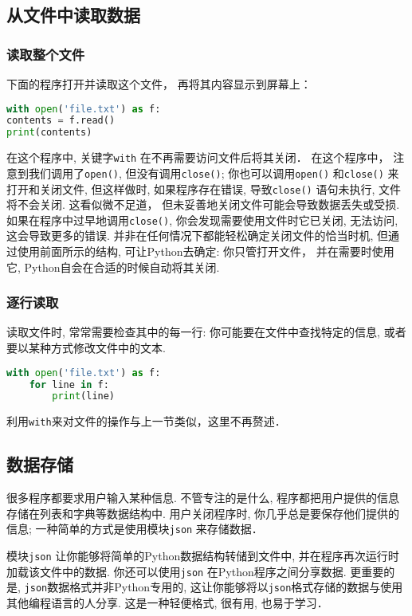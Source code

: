 \subsection{从文件中读取数据}
\subsubsection{读取整个文件}
下面的程序打开并读取这个文件， 再将其内容显示到屏幕上：
\begin{lstlisting}[language=python]
with open('file.txt') as f:
contents = f.read()
print(contents)
\end{lstlisting}
在这个程序中, 关键字\verb|with| 在不再需要访问文件后将其关闭． 在这个程序中， 注意到我们调用了\verb|open()|, 但没有调用\verb|close()|; 你也可以调用\verb|open()| 和\verb|close()| 来打开和关闭文件, 但这样做时, 如果程序存在错误, 导致\verb|close()| 语句未执行, 文件将不会关闭.  这看似微不足道， 但未妥善地关闭文件可能会导致数据丢失或受损.  如果在程序中过早地调用\verb|close()|, 你会发现需要使用文件时它已关闭, 无法访问, 这会导致更多的错误. 并非在任何情况下都能轻松确定关闭文件的恰当时机, 但通过使用前面所示的结构, 可让Python去确定: 你只管打开文件， 并在需要时使用它, Python自会在合适的时候自动将其关闭.

\subsubsection{逐行读取}
读取文件时, 常常需要检查其中的每一行: 你可能要在文件中查找特定的信息, 或者要以某种方式修改文件中的文本.
\begin{lstlisting}[language=python]
with open('file.txt') as f:
    for line in f:
        print(line)
\end{lstlisting}

利用\verb|with|来对文件的操作与上一节类似，这里不再赘述．

\subsection{数据存储}
很多程序都要求用户输入某种信息. 不管专注的是什么, 程序都把用户提供的信息存储在列表和字典等数据结构中.  用户关闭程序时, 你几乎总是要保存他们提供的信息; 一种简单的方式是使用模块\verb|json| 来存储数据．

模块\verb|json| 让你能够将简单的Python数据结构转储到文件中, 并在程序再次运行时加载该文件中的数据. 你还可以使用\verb|json| 在Python程序之间分享数据. 更重要的是, \verb|json|数据格式并非Python专用的, 这让你能够将以\verb|json|格式存储的数据与使用其他编程语言的人分享. 这是一种轻便格式, 很有用, 也易于学习．

